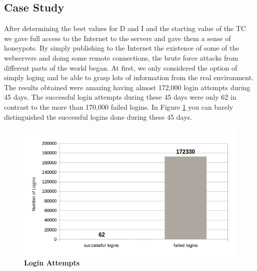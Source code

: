 \documentclass[conference]{IEEEtran}
\begin{document}
\subsection{Case Study}
After determining the best values for D and I and the starting value of the TC we gave full access to the Internet to the servers and gave them a sense of honeypots. By simply publishing to the Internet the existence of some of the webservers and doing some remote connections, the brute force attacks from different parts of the world began. At first, we only considered the option of simply loging and be able to grasp lots of information from the real environment. The results obtained were amazing having almost 172,000 login attempts during 45 days. The successful login attempts during these 45 days were only 62 in contrast to the more than 170,000 failed logins. In Figure \ref{loginattempts} you can barely distinguished the successful logins done during these 45 days.
\begin{figure}[h!]
\caption{\textbf{Login Attempts}}
\label{loginattempts}
\centering
\includegraphics[scale=0.45]{login-attempts.png}
\end{figure}
\end{document}
